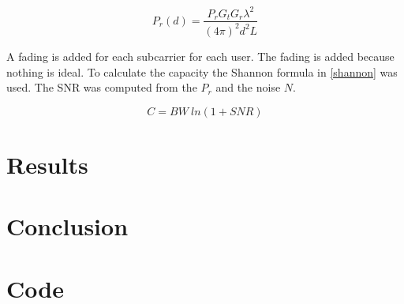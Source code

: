 \documentclass[twocolumn]{article}
\begin{document}
\begin{equation}
\label{power}
P_r(d)=\frac{P_rG_tG_r\lambda^2}{(4\pi)^2d^2L}
\end{equation}

A fading is added for each subcarrier for each user. The fading is added because nothing is ideal.%
To calculate the capacity the Shannon formula in \eqref{shannon} was used. The SNR was computed from the $P_r$ and the noise $N$.

\begin{equation}
\label{shannon}
C=BW~ln(1+SNR)
\end{equation}

\section{Results}




\section{Conclusion}



\onecolumn
\appendix
\section{Code}

\end{document}
